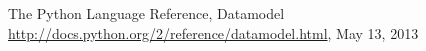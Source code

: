 \begin{thebibliography}{8}

 The Python Language Reference, Datamodel \url{http://docs.python.org/2/reference/datamodel.html}, May 13, 2013
	
\end{thebibliography}